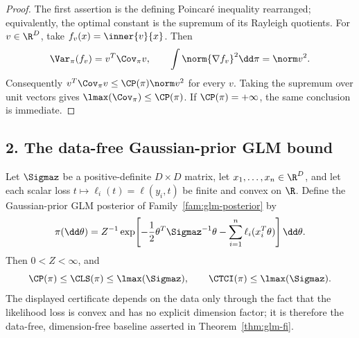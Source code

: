 \documentclass[../main.tex]{subfiles}
\begin{document}
\begin{proof}
The first assertion is the defining Poincar\'e inequality rearranged; equivalently, the optimal
constant is the supremum of its Rayleigh quotients.  For \(v\in\R^D\), take
\(f_v(x)=\inner{v}{x}\).  Then
\[
 \Var_\pi(f_v)=v^T\Cov_\pi v,
 \qquad
 \int\norm{\nabla f_v}^2\dd\pi=\norm v^2.
\]
Consequently \(v^T\Cov_\pi v\le \CP(\pi)\norm v^2\) for every \(v\).  Taking the supremum
over unit vectors gives \(\lmax(\Cov_\pi)\le\CP(\pi)\).  If \(\CP(\pi)=+\infty\), the same
conclusion is immediate.
\end{proof}

\subsection*{2. The data-free Gaussian-prior GLM bound}

\begin{theorem}
\label{thm:sol-glm-fi}
Let \(\Sigmaz\) be a positive-definite \(D\times D\) matrix, let
\(x_1,\ldots,x_n\in\R^D\), and let each scalar loss
\(t\mapsto\ell_i(t)=\ell(y_i,t)\) be finite and convex on \(\R\).  Define the
Gaussian-prior GLM posterior of Family~\ref{fam:glm-posterior} by
\[
 \pi(\dd\theta)=Z^{-1}\exp\!\left[-\frac12\theta^T\Sigmaz^{-1}\theta
              -\sum_{i=1}^n\ell_i(x_i^T\theta)\right]\dd\theta .
\]
Then \(0<Z<\infty\), and
\[
 \CP(\pi)\le\CLS(\pi)\le\lmax(\Sigmaz),
 \qquad
 \CTCI(\pi)\le\lmax(\Sigmaz).
\]
The displayed certificate depends on the data only through the fact that the likelihood loss is
convex and has no explicit dimension factor; it is therefore the data-free, dimension-free
baseline asserted in Theorem~\ref{thm:glm-fi}.
\end{theorem}
\end{document}
